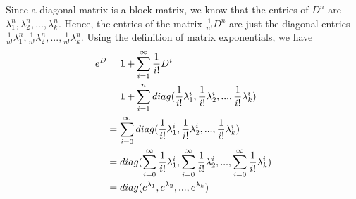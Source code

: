 \documentclass[11pt,onecolumn]{article}
\begin{document}
\begin{answer}
Since a diagonal matrix is a block matrix, we know that the entries of $D^n$ are $\lambda_1^n,\lambda_2^n,...,\lambda_k^n$. Hence, the entries of the matrix $\frac{1}{n!} D^n $ are just the diagonal entries $\frac{1}{n!}\lambda_1^n,\frac{1}{n!}\lambda_2^n,...,\frac{1}{n!}\lambda_k^n $. Using the definition of matrix exponentials, we have
\begin{align*}
    e^D &= \operatorname{\mathbf{1}} + \sum_{i=1}^\infty \frac{1}{i!} D^i \\
    &= \operatorname{\mathbf{1}} + \sum_{i=1}^n diag(\frac{1}{i!} \lambda_1^i, \frac{1}{i!} \lambda_2^i,...,\frac{1}{i!} \lambda_k^i) \\
    &= \sum_{i=0}^\infty diag(\frac{1}{i!} \lambda_1^i, \frac{1}{i!} \lambda_2^i,...,\frac{1}{i!} \lambda_k^i) \\
    &= diag(\sum_{i=0}^\infty \frac{1}{i!} \lambda_1^i, \sum_{i=0}^\infty \frac{1}{i!} \lambda_2^i,...,\sum_{i=0}^\infty \frac{1}{i!} \lambda_k^i) \\
    &= diag(e^{\lambda_1},e^{\lambda_2},...,e^{\lambda_k})
\end{align*}
\end{answer}
\end{document}
